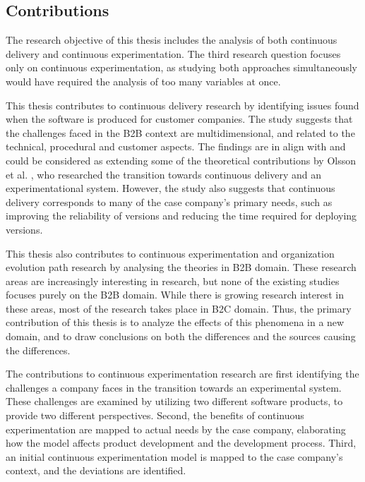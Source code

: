 \documentclass[english, grading]{tktltiki2}
\theoremstyle{definition}
\theoremstyle{remark}
\begin{document}
\subsection{Contributions}
The research objective of this thesis includes the analysis of both continuous delivery and continuous experimentation. The third research question focuses only on continuous experimentation, as studying both approaches simultaneously would have required the analysis of too many variables at once. 

This thesis contributes to continuous delivery research by identifying issues found when the software is produced for customer companies. The study suggests that the challenges faced in the B2B context are multidimensional, and related to the technical, procedural and customer aspects. The findings are in align with and could be considered as extending some of the theoretical contributions by Olsson et al. \cite{olsson2012climbing}, who researched the transition towards continuous delivery and an experimentational system. However, the study also suggests that continuous delivery corresponds to many of the case company's primary needs, such as improving the reliability of versions and reducing the time required for deploying versions.

This thesis also contributes to continuous experimentation \cite{fagerholm2014building, eklund2012architecture, bosch2012building} and organization evolution path \cite{olsson2012climbing} research by analysing the theories in B2B domain. These research areas are increasingly interesting in research, but none of the existing studies focuses purely on the B2B domain. While there is growing research interest in these areas, most of the research takes place in B2C domain. Thus, the primary contribution of this thesis is to analyze the effects of this phenomena in a new domain, and to draw conclusions on both the differences and the sources causing the differences.

The contributions to continuous experimentation research are first identifying the challenges a company faces in the transition towards an experimental system. These challenges are examined by utilizing two different software products, to provide two different perspectives. Second, the benefits of continuous experimentation are mapped to actual needs by the case company, elaborating how the model affects product development and the development process. Third, an initial continuous experimentation model \cite{fagerholm2014building} is mapped to the case company's context, and the deviations are identified.
\end{document}
